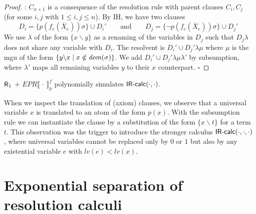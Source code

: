 \documentclass{llncs}
\newcommand{\ih}{{\sf IH}}
\newcommand{\sccase}[1]{\noindent {\sc Case~#1}}
\newcommand{\Rfo}{$\mbox{\sf R}_1$}
\newcommand{\IRcalcPM}[2]{$\mbox{\sf IR-calc}(#1,#2)$}
\newcommand{\IRcalcPMSubst}[3]{$\mbox{\sf IR-calc}(#1,#2,#3)$}
\newcommand{\dom}[1]{\ensuremath\mathit{dom}(#1)}
\newcommand{\sequence}[1]{\overline{#1}}
\newcommand{\is}{\ensuremath{\backslash}}
\newcommand{\EPRQBFtoPL}[3]{\mathit{EPR}\llbracket\,#1\,\rrbracket_{#2}^{#3}}
\newcommand{\level}[1]{{\mathit lv(#1)}}
\renewcommand{\qed}{\hfill\ensuremath{\square}}
\begin{document}
\begin{proof}
\medskip\noindent \sccase{4}: $C_{n+1}$ is a consequence of the
resolution rule with parent clauses $C_i, C_j$ (for some $i,j$ with
$1\leq i,j\leq n$). By \ih, we have two clauses 
\begin{displaymath}
D_i = \{p(f_e(\sequence{X}_e)) \sigma\} \cup D_i' 
\qquad  \text{and} \qquad  
D_j =  \{\neg p(f_e(\sequence{X}_e)) \sigma\} \cup D_j'
\end{displaymath}
We use $\lambda$ of the form $\{x\is y\}$ as a renaming of the
variables in $D_j$ such that $D_j\lambda$ does not share any variable
with $D_i$.  The resolvent is $D_i' \cup D_j'\lambda\mu$ where $\mu$ is
the mgu of the form $\{y\is x\mid x\notin \dom{\sigma}\}$. We add
  $D_i' \cup D_j'\lambda\mu\lambda'$ by subsumption, where $\lambda'$
  maps all remaining variables $y$ to their $x$ counterpart.  \qed
\end{proof}

\begin{corollary}\label{cor:Rfo-EPR-psim-IRcalc}
\Rfo{} $+$ $\EPRQBFtoPL{\cdot}{p}{f}$
polynomially simulates \IRcalcPM{\cdot}{\cdot}.
\end{corollary}

When we inspect the translation of (axiom) clauses, we observe
that a universal variable $x$ is translated to an atom of the form
$p(x)$.  With the subsumption rule we can instantiate the clause by a
substitution of the form $\{x\is t\}$ for a term $t$.  This
observation was the trigger to introduce the stronger calculus
\IRcalcPMSubst{\cdot}{\cdot}{\cdot}, where universal variables cannot
be replaced only by $0$ or $1$ but also by any existential variable
$e$ with $\level{e} < \level{x}$.

\section{Exponential separation of resolution calculi} 
\label{sec:exp-sep} 
\end{document}
